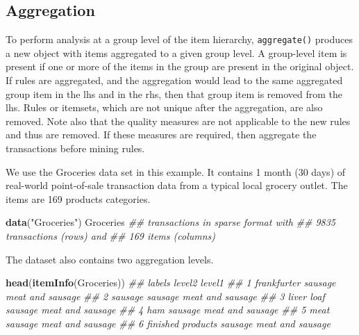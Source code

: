\documentclass[
  notitlepage]{book}
\newenvironment{Shaded}{\begin{snugshade}}{\end{snugshade}}
\newcommand{\CommentTok}[1]{\textcolor[rgb]{0.56,0.35,0.01}{\textit{#1}}}
\newcommand{\KeywordTok}[1]{\textcolor[rgb]{0.13,0.29,0.53}{\textbf{#1}}}
\newcommand{\NormalTok}[1]{#1}
\newcommand{\StringTok}[1]{\textcolor[rgb]{0.31,0.60,0.02}{#1}}
\begin{document}
\hypertarget{aggregation-1}{%
\subsection{Aggregation}\label{aggregation-1}}

To perform analysis at a group level of the item hierarchy, \texttt{aggregate()} produces a new object with items aggregated to a given group level. A group-level item is present if one or more of the items in the group are present in the original object. If rules are aggregated, and the aggregation would lead to the same aggregated group item in the lhs and in the rhs, then that group item is removed from the lhs. Rules or itemsets, which are not unique after the aggregation, are also removed. Note also that the quality measures are not applicable to the new rules and thus are removed. If these measures are required, then aggregate the transactions before mining rules.

We use the Groceries data set in this example. It contains 1 month (30 days) of real-world point-of-sale transaction data from a typical local grocery outlet. The items
are 169 products categories.

\begin{Shaded}
\begin{Highlighting}[]
\KeywordTok{data}\NormalTok{(}\StringTok{"Groceries"}\NormalTok{)}
\NormalTok{Groceries}
\CommentTok{\#\# transactions in sparse format with}
\CommentTok{\#\#  9835 transactions (rows) and}
\CommentTok{\#\#  169 items (columns)}
\end{Highlighting}
\end{Shaded}

The dataset also contains two aggregation levels.

\begin{Shaded}
\begin{Highlighting}[]
\KeywordTok{head}\NormalTok{(}\KeywordTok{itemInfo}\NormalTok{(Groceries))}
\CommentTok{\#\#              labels  level2           level1}
\CommentTok{\#\# 1       frankfurter sausage meat and sausage}
\CommentTok{\#\# 2           sausage sausage meat and sausage}
\CommentTok{\#\# 3        liver loaf sausage meat and sausage}
\CommentTok{\#\# 4               ham sausage meat and sausage}
\CommentTok{\#\# 5              meat sausage meat and sausage}
\CommentTok{\#\# 6 finished products sausage meat and sausage}
\end{Highlighting}
\end{Shaded}
\end{document}
